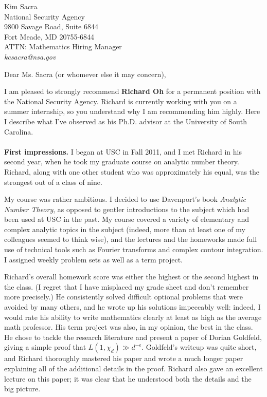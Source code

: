 \documentclass[11pt]{article}
\begin{document}
\pagestyle{fancy}

\vskip 30pt
{Kim Sacra \\ 
National Security Agency \\ 
9800 Savage Road, Suite 6844 \\
Fort Meade, MD 20755-6844 \\
ATTN: Mathematics Hiring Manager \\
{\it kcsacra@nsa.gov}
}

\enlargethispage

\vskip 10pt
Dear Ms. Sacra (or whomever else it may concern),
\vskip 10pt

I am pleased to strongly recommend {\bf Richard Oh} for a permanent position with the National Security Agency.
Richard is currently working with you on a summer internship, so you understand
why I am recommending him highly. Here I describe what I've
observed as his Ph.D. advisor at the University of South Carolina.
\\
\\
{\bf First impressions.}
I began at USC in Fall 2011, and I met Richard in his second year,
when he took my graduate course on analytic number
theory. Richard, along with one other student who was approximately his equal, was the strongest out of
a class of nine.

My course was rather ambitious. I decided to use Davenport's book {\itshape Analytic
Number Theory}, as opposed to gentler introductions to the subject which had been
used at USC in the past. My course covered a variety of elementary and complex analytic topics
in the subject (indeed, more than at least one of my colleagues seemed to think wise), 
and the lectures and the homeworks 
made full use of technical tools such as Fourier transforms and complex contour integration.
I assigned weekly problem sets as well as a term project.

Richard's overall homework score was either the highest or the second highest in the class. (I regret
that I have misplaced my grade sheet and don't remember more precisely.) He consistently solved
difficult optional problems that were avoided by many others, and he wrote up his solutions
impeccably well: indeed, I would rate his ability to write mathematics clearly at least as high as the 
average math professor.
His term project was also, in my opinion, the best in the class. He chose to tackle the research
literature and present a
paper of Dorian Goldfeld, giving a simple proof that $L(1, \chi_d) \gg d^{- \epsilon}$. Goldfeld's
writeup was quite short, and Richard thoroughly mastered his paper and wrote a much longer paper
explaining all of the additional details in the proof. Richard also gave an excellent lecture
on this paper; it was clear that he understood both the details and the big picture.
\end{document}
